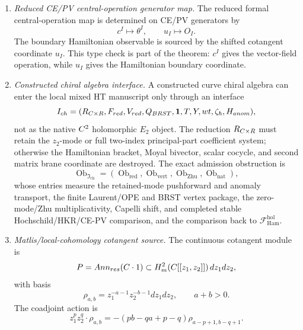 \begin{enumerate}
  \item \emph{Reduced CE/PV central-operation generator map.}
  The reduced formal central-operation map is determined on CE/PV
  generators by
  \[
    c^I\mapsto\theta^I,\qquad u_I\mapsto O_I .
  \]
  The boundary Hamiltonian observable is sourced by the shifted
  cotangent coordinate \(u_I\).  This type check is part of the theorem:
  \(c^I\) gives the vector-field operation, while \(u_I\) gives the
  Hamiltonian boundary coordinate.

  \item \emph{Constructed chiral algebra interface.}
  A constructed curve chiral algebra can enter the local mixed HT
  manuscript only through an interface
  \[
    I_{ch}
    =
    (R_{C\times R},
     F_{red},
     V_{red},
     Q_{BRST},
     \mathbf 1,T,Y,wt,
     \zeta_\hbar,H_{anom}),
  \]
  not as the native \(C^2\) holomorphic \(E_2\) object.  The reduction
  \(R_{C\times R}\) must retain the \(z_2\)-mode or full
  two-index principal-part coefficient system; otherwise the
  Hamiltonian bracket, Moyal bivector, scalar cocycle, and second matrix
  brane coordinate are destroyed.  The exact admission obstruction is
  \[
    \operatorname{Ob}_{\mathfrak I_{\mathrm{ch}}}
    =
    (\operatorname{Ob}_{\mathrm{red}},
     \operatorname{Ob}_{\mathrm{vert}},
     \operatorname{Ob}_{\mathrm{Zhu}},
     \operatorname{Ob}_{\mathrm{nat}}),
  \]
  whose entries measure the retained-mode pushforward and anomaly
  transport, the finite Laurent/OPE and BRST vertex package, the
  zero-mode/Zhu multiplicativity, Capelli shift, and completed stable
  Hochschild/HKR/CE-PV comparison, and the comparison back to
  \(\mathcal F_{\mathrm{Ham}}^{\mathrm{hol}}\).

  \item \emph{Matlis/local-cohomology cotangent source.}
  The continuous cotangent module is
  \[
    P=
    Ann_{res}(C\cdot1)
    \subset H^2_{m}(C[[z_1,z_2]])\,dz_1dz_2,
  \]
  with basis
  \[
    \rho_{a,b}=z_1^{-a-1}z_2^{-b-1}dz_1dz_2,\qquad a+b>0.
  \]
  The coadjoint action is
  \[
    z_1^p z_2^q\cdot\rho_{a,b}
    =
    -(pb-qa+p-q)\rho_{a-p+1,b-q+1}.
  \]


\end{enumerate}
